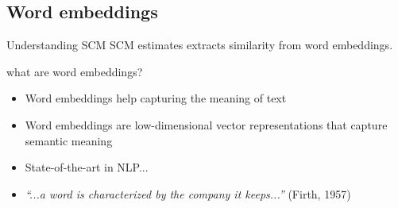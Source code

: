 \documentclass[handout]{beamer}
\begin{document}
\subsection{Word embeddings}

\begin{frame}{Understanding SCM}
SCM estimates extracts similarity from \alert{word embeddings}. 
	\begin{block}{what are word embeddings?}
		\begin{itemize}
			\item<1->Word embeddings help capturing the meaning of text
			\item<2->Word embeddings are low-dimensional vector representations that capture semantic meaning
			\item<3->State-of-the-art in NLP...
			\item<4-> \emph{``...a word is characterized by the company it keeps...''} (Firth, 1957)
		\end{itemize}
	\end{block}
\end{frame}

\begin{frame}{}
\end{frame}

\begin{frame}{}
\end{frame}
\end{document}

